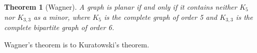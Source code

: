 \documentclass[12pt]{article}
\begin{document}
\newtheorem{thm}{Theorem}
\begin{thm}[Wagner]
A graph is planar if and only if it contains neither $K_5$ nor $K_{3,3}$ as a minor, where $K_5$ is the complete graph of order 5 and $K_{3,3}$ is the complete bipartite graph of order 6. 
\end{thm}
Wagner's theorem  is  to Kuratowski's theorem.
\end{document}
